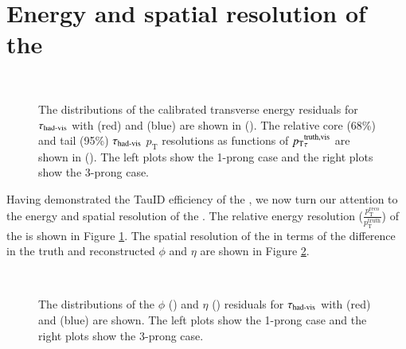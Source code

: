\section{Energy and spatial resolution of the \tauhaderm}
    \label{sec:erm:ereso}
    \begin{figure}[!tb]
        \centering
        \\
        \caption{The distributions of the calibrated transverse energy residuals for $\tau_{\text{had-vis}}$ with
                \tauhaderm (red) and \tauhad (blue) are shown in (\protect{}). 
                The relative core (68\%) and tail (95\%) $\tau_{\text{had-vis}}$ $p_\mathrm{T}$ resolutions as functions of
                $p_{\text{T}}{}_{\tau}^\mathrm{truth,vis}$ are shown in  (\protect{}). 
                The left plots show the 1-prong case and the right plots show the 3-prong case.}
        \label{fig:erm:ereso_trkrm}
    \end{figure}
    Having demonstrated the TauID efficiency of the \tauhaderm, we now turn our 
    attention to the energy and spatial resolution of the \tauhaderm.
    The relative energy resolution ($\frac{p^\mathrm{reco}_\mathrm{T}}{p^\mathrm{truth}_\mathrm{T}}$) 
    of the \tauhaderm is shown in Figure \ref{fig:erm:ereso_trkrm}.
    The spatial resolution of the \tauhaderm in terms of the difference in the 
    truth and reconstructed $\phi$ and $\eta$ are shown in Figure \ref{fig:erm:spatialreso_trkrm}. 
    \begin{figure}[!tb]
        \centering
        \\
        \caption{The distributions of the $\phi$ (\protect{}) 
            and $\eta$ (\protect{}) residuals for $\tau_{\text{had-vis}}$ with
            \tauhaderm (red) and \tauhad (blue) are shown. The left plots show the 1-prong 
            case and the right plots show the 3-prong case.}
        \label{fig:erm:spatialreso_trkrm}
    \end{figure}
